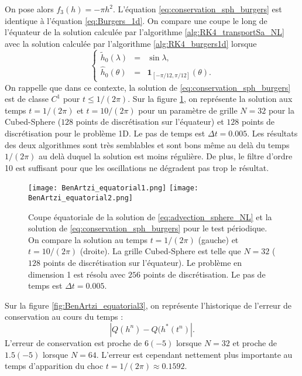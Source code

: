 On pose alors $f_3(h) = - \pi h^2$. L'équation \eqref{eq:conservation_sph_burgers} est identique à l'équation \eqref{eq:Burgers_1d}. On compare une coupe le long de l'équateur de la solution calculée par l'algorithme \ref{alg:RK4_transportSa_NL} avec la solution calculée par l'algorithme \ref{alg:RK4_burgers1d} lorsque
\begin{equation}
\left\lbrace
\begin{array}{rcl}
\tilde{h}_0(\lambda) & = & \sin \lambda, \\
\hat{h}_0(\theta) & = & \mathbf{1}_{[-\pi/12, \pi/12]}(\theta).
\end{array}
\right.
\end{equation}
On rappelle que dans ce contexte, la solution de \eqref{eq:conservation_sph_burgers} est de classe $C^1$ pour $t \leq 1/(2 \pi)$. Sur la figure \ref{fig:BenArtzi_equatorial1}, on représente la solution aux temps $t=1/(2 \pi)$ et $t=10/(2\pi)$ pour un paramètre de grille $N=32$ pour la Cubed-Sphere ($128$ points de discrétisation sur l'équateur) et $128$ points de discrétisation pour le problème 1D. Le pas de temps est $\Delta t=0.005$. Les résultats des deux algorithmes sont très semblables et sont bons même au delà du temps $1/(2 \pi)$ au delà duquel la solution est moins régulière. De plus, le filtre d'ordre 10 est suffisant pour que les oscillations ne dégradent pas trop le résultat.

\begin{figure}[htbp]
\begin{center}
\texttt{[image: BenArtzi\_equatorial1.png]}
\texttt{[image: BenArtzi\_equatorial2.png]}
\end{center}
\caption{Coupe équatoriale de la solution de \eqref{eq:advection_sphere_NL} et la solution de \eqref{eq:conservation_sph_burgers} pour le test périodique. On compare la solution au temps $t=1/(2\pi)$ (gauche) et $t=10/(2\pi)$ (droite). La grille Cubed-Sphere est telle que $N=32$ ($128$ points de discrétisation sur l'équateur). Le problème en dimension 1 est résolu avec $256$ points de discrétisation. Le pas de temps est $\Delta t = 0.005$.}
\label{fig:BenArtzi_equatorial1}
\end{figure} 

Sur la figure \ref{fig:BenArtzi_equatorial3}, on représente l'historique de l'erreur de conservation au cours du temps :
\begin{equation}
|Q(h^n) - Q(h^*(t^n)|.
\end{equation}
L'erreur de conservation est proche de $6 (-5)$ lorsque $N=32$ et proche de $1.5 (-5)$ lorsque $N=64$. L'erreur est cependant nettement plus importante au temps d'apparition du choc $t=1/(2\pi) \approx 0.1592$. 

